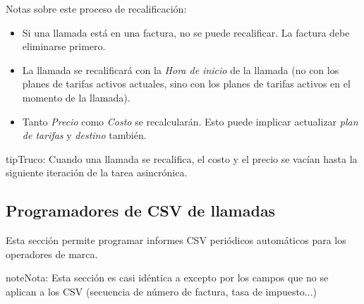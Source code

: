 \documentclass[letterpaper,10pt,spanish]{sphinxmanual}
\begin{document}
Notas sobre este proceso de recalificación:
\begin{itemize}
\item {} 
Si una llamada está en una factura, no se puede recalificar. La factura debe eliminarse primero.

\item {} 
La llamada se recalificará con la \emph{Hora de inicio} de la llamada (no con los planes de tarifas activos actuales, sino con los planes de tarifas activos en el momento de la llamada).

\item {} 
Tanto \emph{Precio} como \emph{Costo} se recalcularán. Esto puede implicar actualizar \emph{plan de tarifas} y \emph{destino} también.

\end{itemize}

\begin{notice}{tip}{Truco:}
Cuando una llamada se recalifica, el costo y el precio se vacían hasta la siguiente iteración de la tarea asincrónica.
\end{notice}


\subsection{Programadores de CSV de llamadas}
\label{administration_portal/brand/calls/call_csv_schedulers:call-csv-schedulers}\label{administration_portal/brand/calls/call_csv_schedulers::doc}\label{administration_portal/brand/calls/call_csv_schedulers:id1}
Esta sección permite programar informes CSV periódicos automáticos para los operadores de marca.

\begin{notice}{note}{Nota:}
Esta sección es casi idéntica a {\hyperref[administration_portal/brand/invoicing/invoice_schedulers:invoice\string-schedulers]{}} excepto por los campos que no se aplican a los CSV (secuencia de número de factura, tasa de impuesto...)
\end{notice}
\end{document}
